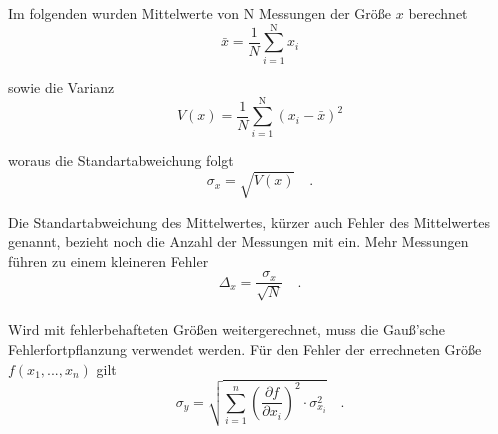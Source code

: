 Im folgenden wurden Mittelwerte von N Messungen der Größe $x$ berechnet
\begin {equation}
\bar{x} =  \frac{1}{N} \sum_{i=1}^\text{N} x_i
\end{equation}

sowie die Varianz
\begin {equation}
V(x) = \frac{1}{N} \sum_{i=1}^\text{N} (x_i - \bar{x})^2
\end{equation}

woraus die Standartabweichung folgt
\begin {equation}
\sigma_x = \sqrt{V(x)} \quad .
\end{equation}

Die Standartabweichung des Mittelwertes, kürzer auch Fehler des Mittelwertes genannt, bezieht noch die Anzahl der Messungen mit ein. Mehr Messungen führen zu einem kleineren Fehler
\begin {equation}
\Delta_{x} = \frac{\sigma_x}{\sqrt{N}} \quad .
\end{equation}
\\
Wird mit fehlerbehafteten Größen weitergerechnet, muss die Gauß'sche Fehlerfortpflanzung verwendet werden. Für den Fehler der errechneten Größe $f(x_1, ... , x_n)$ gilt
\begin{equation}
  \sigma_y = \sqrt{ \sum_{i=1}^{n} \left( \frac{\partial f}{\partial x_i} \right)^2 \cdot \sigma_{x_i} ^2 } \quad .
\end{equation}
